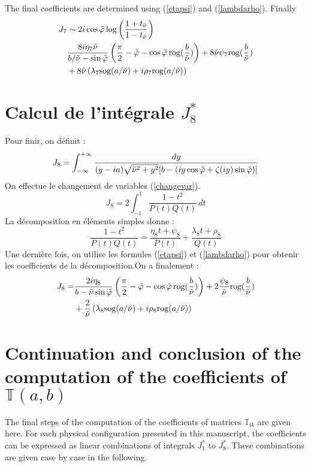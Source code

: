 The final coefficients are determined using (\ref{etapsi}) and (\ref{lambdarho}). Finally
\begin{equation}
\begin{split}
J_7&\sim 2i\cos\tilde{\varphi}\log\left(\frac{1+t_{\tilde{\nu}}}{1-t_{\tilde{\nu}}}\right) \\
&\frac{8i\eta_7\tilde{\nu} }{b/\tilde{\nu}-\sin\tilde{\varphi}}\left(\frac{\pi}{2}-\tilde{\varphi}-\cos\tilde{\varphi} \,\mbox{rog}(\frac{b}{\tilde{\nu}}) \right)+8\tilde{\nu} \psi_7 \mbox{rog}(\frac{b}{\tilde{\nu}} )\\
&+8\tilde{\nu} \left(\lambda_7 \mbox{sog}(a/\tilde{\nu})+i\rho_7 \mbox{rog}(a/\tilde{\nu}) \right)
\end{split}
\label{valJ7}
\end{equation}

\section{Calcul de l'intégrale $J_8^*$ }
\label{calculJ8}
Pour finir, on définit :
\begin{equation}
J_8=\int_{-\infty}^{+\infty}\frac{dy}{(y-ia)\sqrt{\tilde{\nu}^2+y^2}\lbrack b-( iy\cos \tilde{\varphi}+ \zeta(iy)\sin \tilde{\varphi}) \rbrack}
\label{defJ8}
\end{equation}
On effectue le changement de variables (\ref{changevar}).
$$J_8=2 \int_{-1}^{1} \frac{1-t^2}{P(t)Q(t)}\,dt$$
La décomposition en éléments simples donne :
$$\frac{1-t^2}{P(t)Q(t)}=\frac{\eta_8 t+\psi_8}{P(t)}+\frac{\lambda_8 t +\rho_8}{Q(t)}$$
Une dernière fois, on utilise les formules (\ref{etapsi}) et (\ref{lambdarho}) pour obtenir les coefficients de la décomposition.On a finalement :
\begin{equation}
\begin{split}
J_8=&\frac{2i\eta_8 }{b-\tilde{\nu}\sin\tilde{\varphi}}\left(\frac{\pi}{2}-\tilde{\varphi}-\cos\tilde{\varphi} \,\mbox{rog}(\frac{b}{\tilde{\nu}}) \right)+2 \frac{\psi_8}{\tilde{\nu}} \mbox{rog}(\frac{b}{\tilde{\nu}} )\\
&+\frac{2}{\tilde{\nu}} \left(\lambda_8 \mbox{sog}(a/\tilde{\nu})+i\rho_8 \mbox{rog}(a/\tilde{\nu}) \right)
\end{split}
\label{valJ8}
\end{equation}

\section{Continuation and conclusion of the computation of the coefficients of $\mathbb{T}(a,b)$}
\label{fincalculs}
The final steps of the computation of the coefficients of matrices $\mathbb{T}_{lk}$ are given here. For each physical configuration presented in this manuscript, the coefficients can be expressed as linear combinations of integrals $J_1^*$ to $J_8^*$. These combinations are given case by case in the following.

